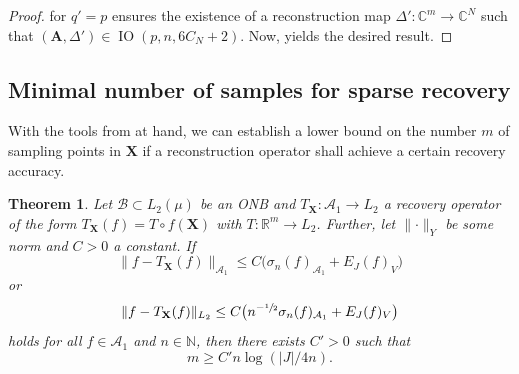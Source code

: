 \documentclass[11pt,reqno, a4paper]{article}
\numberwithin{equation}{section}
\newtheorem{theorem}{Theorem}[section]
\newcommand{\R}{\mathbb{R}}
\newcommand{\C}{\mathbb{C}}
\begin{document}
\begin{proof}
 for $q'=p$ ensures the existence of a reconstruction map $\Delta'\colon \C^m \to\C^N$ such that $(\mathbf{A},\Delta')\in\operatorname{IO}(p,n,6C_N+2)$.
Now,  yields the desired result.
\end{proof}

\subsection{Minimal number of samples for sparse recovery}
With the tools from  at hand, we can establish a lower bound on the number $m$ of sampling points in $\mathbf{X}$ if a reconstruction operator shall achieve a certain recovery accuracy.
\begin{theorem}\label{instance_B1B1}Let $\mathcal{B} \subset L_2(\mu)$ be an ONB and $T_{\mathbf{X}} \colon \mathcal{A}_1 \to L_2$ a recovery operator of the form $T_{\mathbf{X}}(f) = T \circ f(\mathbf{X})$ with $T\colon \R^m \to L_2$.
Further, let $\lVert\cdot\rVert_Y$ be some norm and $C>0$ a constant.
If
\begin{equation}\label{eq:Instance_Optimality_A1A1}
\lVert f - T_{\mathbf{X}}(f) \rVert_{\mathcal{A}_1} \leq C \big(\sigma_n(f)_{\mathcal{A}_1}+E_J(f)_V\big)
\end{equation}
or
\begin{equation}\label{eq:Instance_Optimality_L2A1}
\lVert f - T_{\mathbf{X}}(f) \rVert_{L_2} \leq C\big(n^{-\sfrac{1}{2}}\sigma_n(f)_{\mathcal{A}_1} + E_J(f)_V\big)
\end{equation}
holds for all $f\in\mathcal{A}_1$ and $n\in\mathbb{N}$, then there exists $C'>0$ such that
\begin{equation}\label{eq:LowerBoundM}
m \geq C'n\log(\lvert J\rvert/4n).
\end{equation}
\end{theorem}
\end{document}
